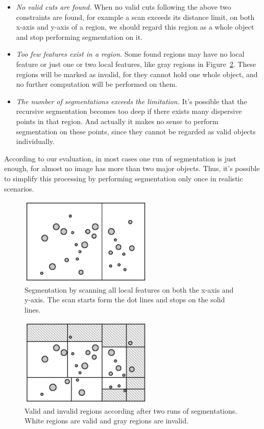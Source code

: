 \begin{itemize}

  \item \textit{No valid cuts are found.} When no valid cuts following the above two constraints are found, for example a scan exceeds its distance limit, on both x-axis and y-axis of a region, we should regard this region as a whole object and stop performing segmentation on it.

  \item \textit{Too few features exist in a region.} Some found regions may have no local feature or just one or two local features, like gray regions in Figure~\ref{fig:segmentation-2}. These regions will be marked as invalid, for they cannot hold one whole object, and no further computation will be performed on them.

  \item \textit{The number of segmentations exceeds the limitation.} It's possible that the recursive segmentation becomes too deep if there exists many dispersive points in that region. And actually it makes no sense to perform segmentation on these points, since they cannot be regarded as valid objects individually.

\end{itemize}

According to our evaluation, in most cases one run of segmentation is just enough, for almost no image has more than two major objects. Thus, it's possible to simplify this processing by performing segmentation only once in realistic scenarios.

\begin{figure}[!t]
\centering
\includegraphics[width=2.5in]{images/fig-segmentation.eps}
\caption{Segmentation by scanning all local features on both the x-axis and y-axis. The scan starts form the dot lines and stops on the solid lines.}
\label{fig:segmentation}
\end{figure}

\begin{figure}[!t]
\centering
\includegraphics[width=2.5in]{images/fig-segmentation-2.eps}
\caption{Valid and invalid regions according after two runs of segmentations. White regions are valid and gray regions are invalid.}
\label{fig:segmentation-2}
\end{figure}


